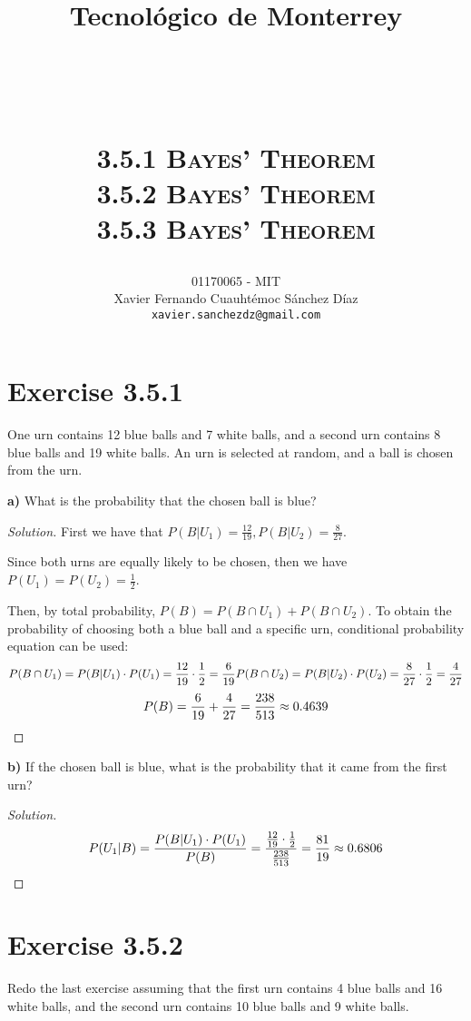 \documentclass[titlepage, letterpaper, fleqn]{article}
\title{
\vspace{1in}
\textbf{Tecnológico de Monterrey} \\
\vspace{0.5in}
\textmd{\mahclass} \\
\large{\textit{\mahteacher}} \\
\vspace{0.5in}
\textsc{\mahtitle}\\
\textsc{3.5.1 Bayes' Theorem}\\
\textsc{3.5.2 Bayes' Theorem}\\
\textsc{3.5.3 Bayes' Theorem}\\
\author{01170065  - MIT \\
Xavier Fernando Cuauhtémoc Sánchez Díaz \\
\texttt{xavier.sanchezdz@gmail.com}}
\date{\mahdate}
}
\newcommand{\spacepls}{\vspace{5mm}}
\renewcommand\qedsymbol{\(\blacksquare\)}
\newenvironment{solution}
{\renewcommand\qedsymbol{$\square$}\begin{proof}[Solution]}
{\end{proof}}
\begin{document}
\begin{titlepage}
\maketitle
\end{titlepage}

%
%

\section{Exercise 3.5.1}

{\large One urn contains 12 blue balls and 7 white balls, and a second urn contains 8 blue balls and 19 white balls.
An urn is selected at random, and a ball is chosen from the urn.

\textbf{a)} What is the probability that the chosen ball is blue?}

\begin{solution}
First we have that \(P(B|U_1) = \frac{12}{19}, P(B|U_2) = \frac{8}{27}\).

Since both urns are equally likely to be chosen, then we have \(P(U_1) = P(U_2) = \frac{1}{2}\).

Then, by total probability, \(P(B) = P(B \cap U_1) + P(B \cap U_2)\).
To obtain the probability of choosing both a blue ball and a specific urn, conditional probability equation can be used:
\[P(B \cap U_1) = P(B|U_1) \cdot P(U_1) = \frac{12}{19} \cdot \frac{1}{2} = \frac{6}{19} \\
P(B \cap U_2) = P(B|U_2) \cdot P(U_2) = \frac{8}{27} \cdot \frac{1}{2} = \frac{4}{27}\]
\[P(B) = \frac{6}{19} + \frac{4}{27} = \frac{238}{513} \approx 0.4639 \qedhere \]
\end{solution}

\spacepls

{\large \textbf{b)} If the chosen ball is blue, what is the probability that it came from the first urn?}

\begin{solution}
\[P(U_1|B) = \frac{P(B|U_1) \cdot P(U_1)}{P(B)} = \frac{\frac{12}{19} \cdot \frac{1}{2}}{\frac{238}{513}} = \frac{81}{19} \approx 0.6806 \qedhere\]
\end{solution}

\section{Exercise 3.5.2}

{\large Redo the last exercise assuming that the first urn contains 4 blue balls and 16 white balls,
and the second urn contains 10 blue balls and 9 white balls.}
\end{document}
